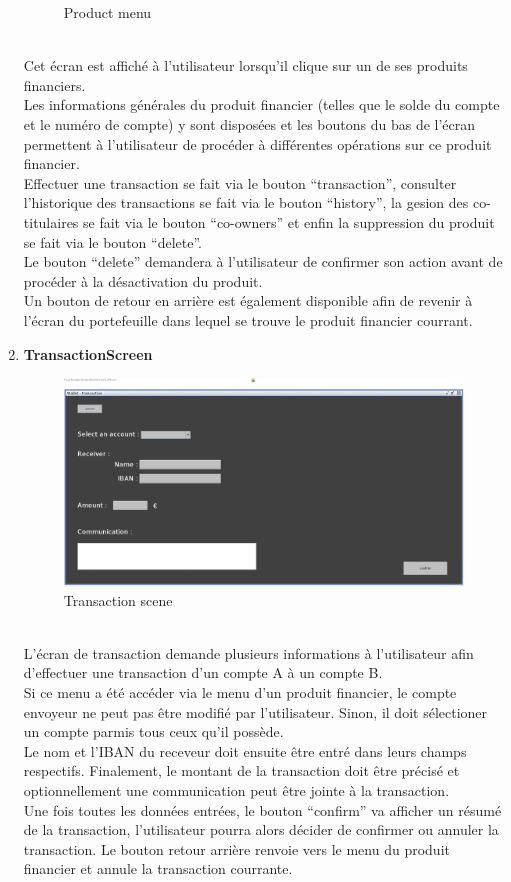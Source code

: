 \documentclass[../rapport.tex]{subfiles}
\begin{document}
\begin{enumerate}
\begin{figure}[h!]
				\caption{Product menu}
		\end{figure}
		\\
Cet écran est affiché à l'utilisateur lorsqu'il clique sur un de ses produits financiers. \\
Les informations générales du produit financier (telles que le solde du compte et le numéro de compte) y sont disposées et les boutons du bas de l'écran permettent à l'utilisateur de procéder à différentes opérations sur ce produit financier.\\
Effectuer une transaction se fait via le bouton ``transaction'', consulter l'historique des transactions se fait via le bouton ``history'',
la gesion des co-titulaires se fait via le bouton ``co-owners'' et enfin la suppression du produit se fait via le bouton ``delete''.\\
Le bouton ``delete'' demandera à l'utilisateur de confirmer son action avant de procéder à la désactivation du produit.\\
Un bouton de retour en arrière est également disponible afin de revenir à l'écran du portefeuille dans lequel se trouve le produit financier courrant.

\item \textbf{TransactionScreen}\\
		\begin{figure}[h!]
				\centering \includegraphics[scale=0.2]{ressources/photos_diagrammes/app1/gui/performTransaction.jpg}
				\caption{Transaction scene}
		\end{figure}
		\\
L'écran de transaction demande plusieurs informations à l'utilisateur afin d'effectuer une transaction d'un compte A à un compte B.\\
Si ce menu a été accéder via le menu d'un produit financier, le compte envoyeur ne peut pas être modifié par l'utilisateur. Sinon, il doit sélectioner un compte parmis tous ceux qu'il possède.\\
Le nom et l'IBAN du receveur doit ensuite être entré dans leurs champs respectifs. Finalement, le montant de la transaction doit être précisé et optionnellement une communication peut être jointe à la transaction.\\
Une fois toutes les données entrées, le bouton ``confirm'' va afficher un résumé de la transaction, l'utilisateur pourra alors décider de confirmer ou annuler la transaction.
Le bouton retour arrière renvoie vers le menu du produit financier et annule la transaction courrante.


\end{enumerate}
\end{document}
